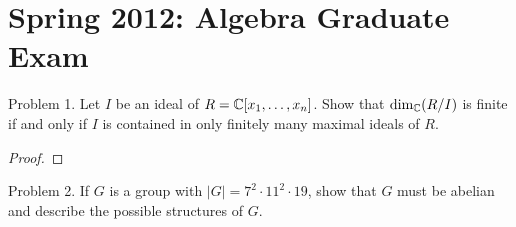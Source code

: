 \documentclass{article}
\begin{document}
\section{Spring 2012: Algebra Graduate Exam}
\label{sec:spring2012}

\begin{subsection}{Problem 1.}
  Let $I$ be an ideal of $R = \mathbb C[x_1, \hdots, x_n]$. Show that $\dim_\mathbb C(R/I)$ is finite if and only if $I$ is contained in only finitely many maximal ideals of $R$.
\end{subsection}

\begin{proof}
\end{proof}
\pagebreak

\begin{subsection}{Problem 2.}
  If $G$ is a group with $|G| = 7^2 \cdot 11^2 \cdot 19$, show that $G$ must be
  abelian and describe the possible structures of $G$.
\end{subsection}
\end{document}
